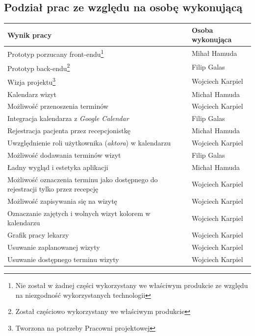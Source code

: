 \documentclass[polish,12pt]{aghthesis}
\begin{document}
  
\subsection{Podział prac ze względu na osobę wykonującą}
\begin{center}
  \begin{tabular}{ | l | l | }
    \hline
    Wynik pracy & Osoba wykonująca \\ \hline \hline
    Prototyp  porzucany front-endu\footnote{Nie został w żadnej części wykorzystany we właściwym produkcie ze względu na niezgodność wykorzystanych technologii} & Mihał Hamuda \\ \hline
    Prototyp back-endu\footnote{Został częściowo wykorzystany we właściwym produkcie} & Filip Galas  \\ \hline
    Wizja projektu\footnote{Tworzona na potrzeby Pracowni projektowej} & Wojciech Karpiel \\ \hline
    Kalendarz wizyt & Michał Hamuda \\ \hline
    Możliwość przenoszenia terminów & Wojciech Karpiel \\ \hline
    Integracja kalendarza z \emph{Google Calendar} & Filip Galas \\ \hline
    Rejestracja pacjenta przez recepcjonistkę & Michał Hamuda \\ \hline
    Uwzględnienie roli użytkownika (\emph{aktora}) w kalendarzu & Wojciech Karpiel \\ \hline
    Możliwość dodawania terminów wizyt & Filip Galas \\ \hline
    Ładny wygląd i estetyka aplikacji & Michał Hamuda \\ \hline
    Możliwość oznaczenia terminu jako dostępnego do rejestracji tylko przez recepcję & Wojciech Karpiel \\ \hline
    Możliwość zapisywania się na wizytę & Wojciech Karpiel \\ \hline
    Oznaczanie zajętych i wolnych wizyt kolorem w kalendarzu & Wojciech Karpiel \\ \hline
    Grafik pracy lekarzy & Wojciech Karpiel \\ \hline
    Usuwanie zaplanowanej wizyty & Wojciech Karpiel \\ \hline
    Usuwanie dostępnego terminu wizyty & Wojciech Karpiel \\ \hline

\end{tabular}
\end{center}
\end{document}
